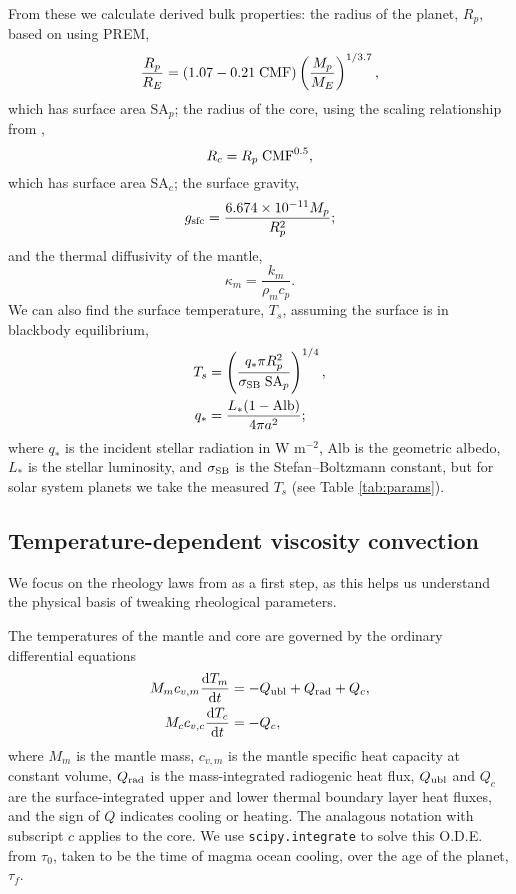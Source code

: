 From these we calculate derived bulk properties: the radius of the planet, $R_p$, based on \citet{Zeng2016} using PREM,
\begin{equation}
\frac{R_p}{R_E} = (1.07 - 0.21\; {\rm CMF})\left(\frac{M_p}{M_E}\right)^{1/3.7},
\end{equation}
which has surface area SA$_p$; the radius of the core, using the scaling relationship from \citet{Zeng2017},
\begin{equation}
R_c = R_p \; {\rm CMF}^{0.5},
\end{equation}
which has surface area SA$_c$; the surface gravity,
\begin{equation}
g_{\rm sfc} =\frac{6.674\times 10^{-11}M_p}{R_p^2};
\end{equation}
and the thermal diffusivity of the mantle,
\begin{equation}
\kappa_m = \frac{k_m}{\rho_m c_p}.
\end{equation}
We can also find the surface temperature, $T_s$, assuming the surface is in blackbody equilibrium,
\begin{align}
T_s &= \left(\frac{q_* \pi R_p^2}{\sigma_{\rm SB} \; {\rm SA}_p}\right)^{1/4},\\
q_* &= \frac{L_*(1-{\rm Alb})}{4 \pi a^2};
\end{align}
where $q_*$ is the incident stellar radiation in W m$^{-2}$, Alb is the geometric albedo, $L_*$ is the stellar luminosity, and $\sigma_{\rm SB}$ is the Stefan–Boltzmann constant, but for solar system planets we take the measured $T_s$ (see Table \ref{tab:params}).




\subsection{Temperature-dependent viscosity convection}\label{sec:viscosity-model}

We focus on the rheology laws from \citet{Karato1993} as a first step, as this helps us understand the physical basis of tweaking rheological parameters.

The temperatures of the mantle and core are governed by the ordinary differential equations
\begin{align}
M_m c_{v, m} \frac{{\rm d}T_m}{{\rm d}t} &= -Q_{\rm ubl} + Q_{\rm rad} + Q_c, \\
M_c c_{v, c} \frac{{\rm d}T_c}{{\rm d}t} &= -Q_c,
\end{align}
where $M_m$ is the mantle mass, $c_{v, m}$ is the mantle specific heat capacity at constant volume, $Q_{\rm rad}$ is the mass-integrated radiogenic heat flux, $Q_{\rm ubl}$ and $Q_{c}$ are the surface-integrated upper and lower thermal boundary layer heat fluxes, and the sign of $Q$ indicates cooling or heating. The analagous notation with subscript $c$ applies to the core. We use {\tt scipy.integrate} to solve this O.D.E. from $\tau_0$, taken to be the time of magma ocean cooling, over the age of the planet, $\tau_f$.  

